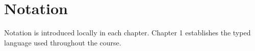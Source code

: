\section*{Notation}
Notation is introduced locally in each chapter. Chapter 1 establishes the typed language used throughout the course.
